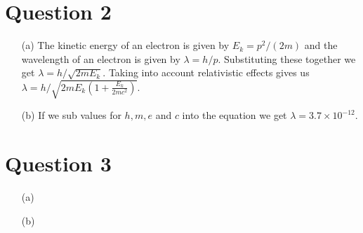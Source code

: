 \documentclass[10pt,a4paper]{article}
\begin{document}
\section*{Question 2}

\begin{itemize}
	\item[(a)] The kinetic energy of an electron is given by $E_{k} = p^{2}/(2m)$ and the wavelength of an electron is given by $\lambda = h/p$. Substituting these together we get $\lambda = h/\sqrt{2mE_{k}}$. Taking into account relativistic effects gives us $\lambda = h/\sqrt{2mE_{k}(1+\frac{E_{k}}{2mc^{2}})}$.
	\item[(b)] If we sub values for $h, m, e $ and $c$ into the equation we get $\lambda = 3.7 \times 10^{-12}$.
\end{itemize}

\section*{Question 3}

\begin{itemize}
	\item[(a)]
	\item[(b)]
\end{itemize}
\end{document}
